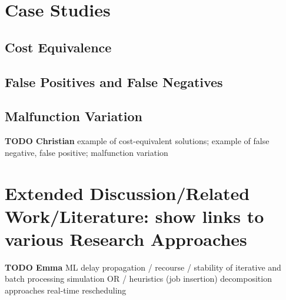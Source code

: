 \documentclass{article}
\begin{document}
\section{Case Studies}\label{sec:CaseStudies}

\subsection{Cost Equivalence}\label{subsec:cost_equivalence}

\subsection{False Positives and False Negatives}\label{subsec:false_positives_false_negatives}

\subsection{Malfunction Variation}\label{subsec:malfunction_variation}

\begin{mdframed}
{\bf TODO Christian} example of cost-equivalent solutions; example of false negative, false positive; malfunction variation
\end{mdframed}




\section{Extended Discussion/Related Work/Literature: show links to various Research Approaches}

\begin{mdframed}
{\bf TODO Emma}         ML
        delay propagation / recourse / stability of iterative and batch processing
        simulation
        OR / heuristics (job insertion)
        decomposition approaches
        real-time rescheduling

\end{mdframed}



\end{document}

